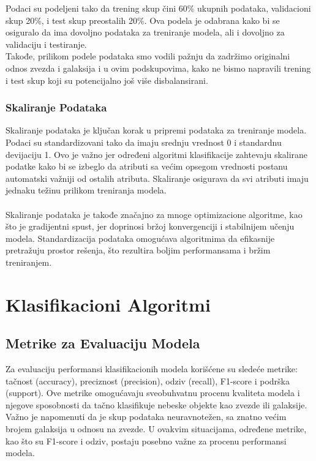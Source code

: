 \documentclass[a4paper,12pt]{article}
\begin{document}
Podaci su podeljeni tako da trening skup čini 60\% ukupnih podataka, validacioni skup 20\%, i test skup preostalih 20\%. Ova podela je odabrana kako bi se osiguralo da ima dovoljno podataka za treniranje modela, ali i dovoljno za validaciju i testiranje.\\
Takođe, prilikom podele podataka smo vodili pažnju da zadržimo originalni odnos zvezda i galaksija i u ovim podskupovima, kako ne bismo napravili trening i test skup koji su potencijalno još više disbalansirani.

\subsubsection{Skaliranje Podataka}
Skaliranje podataka je ključan korak u pripremi podataka za treniranje modela. Podaci su standardizovani tako da imaju srednju vrednost 0 i standardnu devijaciju 1. Ovo je važno jer određeni algoritmi klasifikacije zahtevaju skalirane podatke kako bi se izbeglo da atributi sa većim opsegom vrednosti postanu automatski važniji od ostalih atributa. Skaliranje osigurava da svi atributi imaju jednaku težinu prilikom treniranja modela.\\\\
Skaliranje podataka je takođe značajno za mnoge optimizacione algoritme, kao što je gradijentni spust, jer doprinosi bržoj konvergenciji i stabilnijem učenju modela. Standardizacija podataka omogućava algoritmima da efikasnije pretražuju prostor rešenja, što rezultira boljim performansama i bržim treniranjem.



\section{Klasifikacioni Algoritmi}

\subsection{Metrike za Evaluaciju Modela}
Za evaluaciju performansi klasifikacionih modela korišćene su sledeće metrike: tačnost (accuracy), preciznost (precision), odziv (recall), F1-score i podrška (support). Ove metrike omogućavaju sveobuhvatnu procenu kvaliteta modela i njegove sposobnosti da tačno klasifikuje nebeske objekte kao zvezde ili galaksije.\\
Važno je napomenuti da je skup podataka neuravnotežen, sa znatno većim brojem galaksija u odnosu na zvezde. U ovakvim situacijama, određene metrike, kao što su F1-score i odziv, postaju posebno važne za procenu performansi modela.
\end{document}

